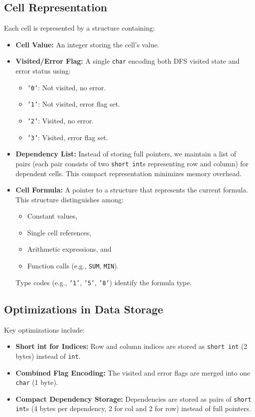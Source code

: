 \documentclass[10pt]{article}
\begin{document}
\subsection{Cell Representation}
Each cell is represented by a structure containing:
\begin{itemize}[noitemsep]
    \item \textbf{Cell Value:} An integer storing the cell's value.
    \item \textbf{Visited/Error Flag:} A single \texttt{char} encoding both DFS visited state and error status using:
    \begin{itemize}[noitemsep]
        \item \texttt{'0'}: Not visited, no error.
        \item \texttt{'1'}: Not visited, error flag set.
        \item \texttt{'2'}: Visited, no error.
        \item \texttt{'3'}: Visited, error flag set.
    \end{itemize}
    \item \textbf{Dependency List:} Instead of storing full pointers, we maintain a list of pairs (each pair consists of two \texttt{short int}s representing row and column) for dependent cells. This compact representation minimizes memory overhead.
    \item \textbf{Cell Formula:} A pointer to a structure that represents the current formula. This structure distinguishes among:
    \begin{itemize}[noitemsep]
        \item Constant values,
        \item Single cell references,
        \item Arithmetic expressions, and
        \item Function calls (e.g., \texttt{SUM}, \texttt{MIN}).
    \end{itemize}
    Type codes (e.g., \texttt{'1'}, \texttt{'5'}, \texttt{'8'}) identify the formula type.
\end{itemize}

\subsection{Optimizations in Data Storage}
Key optimizations include:
\begin{itemize}[noitemsep]
    \item \textbf{Short int for Indices:} Row and column indices are stored as \texttt{short int} (2 bytes) instead of \texttt{int}.
    \item \textbf{Combined Flag Encoding:} The visited and error flags are merged into one \texttt{char} (1 byte).
    \item \textbf{Compact Dependency Storage:} Dependencies are stored as pairs of \texttt{short int}s (4 bytes per dependency, 2 for col and 2 for row) instead of full pointers.
\end{itemize}
\end{document}
